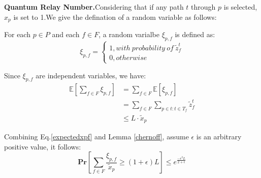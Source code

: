 \textbf{Quantum Relay Number.}Considering that if any path $t$ through $p$ is selected, $\hat{x}_p$ is set to 1.We give the defination of a random variable as follows:
\begin{definition}\label{def:x}
	For each $p \in P$ and each $f \in F$, a random varialbe $\xi_{p,f}$ is defined as:
	\begin{equation}\label{xpf}
	\xi_{p,f}=
	\begin{cases}
	1, with \ probability \ of \ \widetilde{z}_f^t \\
	0, otherwise
	\end{cases}
	\end{equation}
	
\end{definition}
Since $\xi_{p,f}$ are independent variables, we have:
\begin{equation}\label{expectedxpf}
\begin{aligned}
\mathbb{E}[\sum_{f \in F}\xi_{p,f}] &= \sum_{f \in F}\mathbb{E}[\xi_{p,f}] \\
& = \sum_{f \in F}\sum_{p \in t:t \in T_f}\widetilde{z}_f^t\\
& \le L \cdot \widetilde{x}_p
\end{aligned}
\end{equation}

Combining Eq.\ref{expectedxpf} and Lemma \ref{chernoff}, assume $\epsilon$ is an arbitrary positive value, it follows:
\begin{equation}\label{pr1}
\textbf{Pr}[\sum_{f \in F} \frac{\xi_{p,f}}{\widetilde{x}_p} \ge (1+\epsilon)L] \le e^{\frac{-\epsilon^2L}{2+\epsilon}}
\end{equation}


